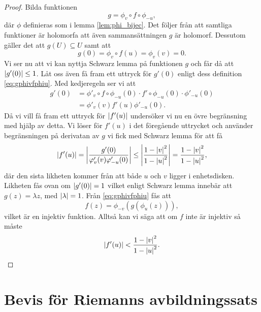 \begin{proof}
	Bilda funktionen
	\begin{equation}
		\label{eq:gphivfphiu}
		g = \phi_v \circ f \circ \phi_{-u},
	\end{equation}
	där $\phi$ definieras som i lemma \ref{lem:phi_bijec}. Det följer från att samtliga funktioner är holomorfa att även sammansättningen $g$ är holomorf. Dessutom gäller det att $g(U) \subseteq U$ samt att
	\begin{equation*}
		g(0) = \phi_v \circ f\left(u\right) = \phi_v(v) = 0.
	\end{equation*}
	Vi ser nu att vi kan nyttja Schwarz lemma på funktionen $g$ och får då att $\left\lvert g'(0) \right\rvert \le 1$. Låt oss även få fram ett uttryck för $g'(0)$ enligt dess definition \eqref{eq:gphivfphiu}. Med kedjeregeln ser vi att
	\begin{align*}
		g'(0) & =  \phi'_v \circ f \circ \phi_{-u}(0) \cdot f' \circ \phi_{-u}(0) \cdot \phi'_{-u}(0) \\
		      & = \phi'_v(v)f'(u)\phi'_{-u}(0).
	\end{align*}
	Då vi vill få fram ett uttryck för $\left\lvert f'(u) \right\rvert$ undersöker vi nu en övre begränsning med hjälp av detta. Vi löser för $f'(u)$ i det föregående uttrycket och använder begränsningen på derivatan av $g$ vi fick med Schwarz lemma för att få
	\begin{equation*}
		\left\lvert f'(u) \right\rvert = \left\lvert \frac{g'(0)}{\varphi'_v(v)\varphi'_{-u}(0)} \right\rvert \le \left\lvert \frac{1 - \left\lvert v \right\rvert^2}{1 - \left\lvert u \right\rvert^2} \right\rvert = \frac{1 - \left\lvert v \right\rvert^2}{1 - \left\lvert u \right\rvert^2},
	\end{equation*}
	där den sista likheten kommer från att både $u$ och $v$ ligger i enhetsdisken. Likheten fås ovan om $\left\lvert g'(0) \right\rvert=1$ vilket enligt Schwarz lemma innebär att $g(z) = \lambda z$, med $\left\lvert \lambda \right\rvert = 1$. Från \eqref{eq:gphivfphiu} fås att
	\begin{equation}
		f(z) = \phi_{-v}(g(\phi_u(z))),
	\end{equation}
	vilket är en injektiv funktion. Alltså kan vi säga att om $f$ inte är injektiv så måste
	\begin{equation*}
		\left\lvert f'(u) \right\rvert < \frac{1 - \left\lvert v \right\rvert^2}{1 - \left\lvert u \right\rvert^2}.
	\end{equation*}
\end{proof}

\section{Bevis för Riemanns avbildningssats}

